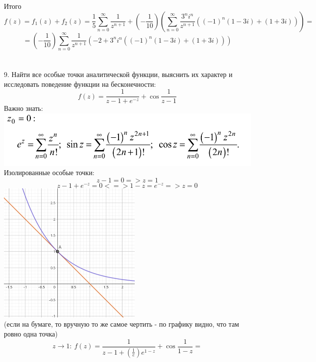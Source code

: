 \documentclass[14pt]{extarticle}
\begin{document}
Итого\\
$$f(z)= f_1(z) + f_2(z) = 
\frac{1}{5} \sum_{n=0}^{\infty}\frac{1}{z^{n+1}} + 
\left(-\frac{1}{10}\right) 
\left(\sum_{n=0}^{\infty}\frac{3^n i^n}{z^{n+1}}
((-1)^n(1-3i)+(1+3i))\right)=$$
$$=\left(-\frac{1}{10}\right)\sum_{n=0}^{\infty}
\frac{1}{z^{n+1}}\left(-2+3^n i^n((-1)^n(1-3i)+(1+3i))\right)$$
\\\\
9. Найти все особые точки аналитической функции, выяснить их
характер и исследовать поведение функции на бесконечности:
$$f(z)=\frac{1}{z-1+e^{-z}}+\cos{\frac{1}{z-1}}$$
Важно знать:\\
\includegraphics[width=400pt]{img7.png} \\
Изолированные особые точки: 
$$z-1=0 => z=1$$
$$z-1+e^{-z}=0 <=> 1-z = e^{-z} => z=0$$
\includegraphics[width=200pt]{img6.png} \\
(если на бумаге, то вручную то же самое чертить - по графику видно,
что там ровно одна точка)
$$z\to 1: \ f(z) = \frac{1}{z-1 + \left(\frac{1}{e}\right)e^{1-z}}
+ \cos{\frac{1}{1-z}} = $$
\end{document}
